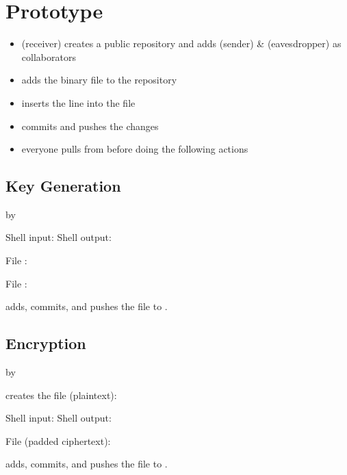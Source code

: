 \section{Prototype}

\begin{itemize}
\item \bob{} (receiver)
  creates a public \github{} repository and
  adds \alice{} (sender) \& \eve{} (eavesdropper)
  as collaborators
\item \bob{} adds the binary file \cryout{}
  to the repository
\item \bob{} inserts the line 
  into the file 
\item \bob{} commits and pushes the changes
\item everyone pulls from \github{}
  before doing the following actions
\end{itemize}


\subsection{Key Generation}
by \bob \bigskip

Shell input: \generatekeysindemo
Shell output: \generatekeysoutdemo

File \public{\bobdemo}:
\codestt{}

File \private{\bobdemo}:
\codestt{}

\bob{} adds, commits, and pushes
the file \public{\bobdemo} to \github.


\subsection{Encryption}
by \alice \bigskip

\alice{} creates the file \private{\alicedemo} (plaintext):
\codestt{}

Shell input: \encryptindemo
Shell output: \encryptoutdemo

File \public{\alicedemo} (padded ciphertext):
\codestt{}

\alice{} adds, commits, and pushes
the file \public{\alicedemo} to \github.


